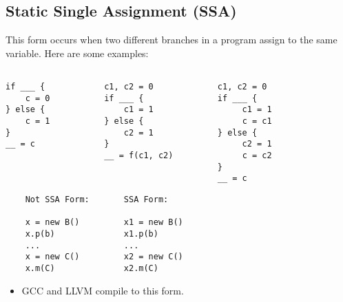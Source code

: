 \documentclass[10pt]{article}
\begin{document}
\subsection*{Static Single Assignment (SSA)}
This form occurs when two different branches in a program assign to the same variable.  Here are some examples:
\begin{verbatim}

if ___ {            c1, c2 = 0             c1, c2 = 0 
    c = 0           if ___ {               if ___ { 
} else {                c1 = 1                  c1 = 1
    c = 1           } else {                    c = c1
}                       c2 = 1             } else {
__ = c              }                           c2 = 1
                    __ = f(c1, c2)              c = c2
                                           }
                                           __ = c
\end{verbatim}
\begin{verbatim}
    Not SSA Form:       SSA Form:

    x = new B()         x1 = new B()
    x.p(b)              x1.p(b)
    ...                 ...
    x = new C()         x2 = new C()
    x.m(C)              x2.m(C)
\end{verbatim}
\begin{itemize}
    \item GCC and LLVM compile to this form.
\end{itemize}
\pagebreak
\end{document}
